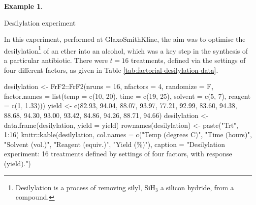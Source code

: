 \documentclass[
]{book}
\newenvironment{Shaded}{\begin{snugshade}}{\end{snugshade}}
\newcommand{\AttributeTok}[1]{\textcolor[rgb]{0.77,0.63,0.00}{#1}}
\newcommand{\DecValTok}[1]{\textcolor[rgb]{0.00,0.00,0.81}{#1}}
\newcommand{\FloatTok}[1]{\textcolor[rgb]{0.00,0.00,0.81}{#1}}
\newcommand{\FunctionTok}[1]{\textcolor[rgb]{0.00,0.00,0.00}{#1}}
\newcommand{\NormalTok}[1]{#1}
\newcommand{\OtherTok}[1]{\textcolor[rgb]{0.56,0.35,0.01}{#1}}
\newcommand{\SpecialCharTok}[1]{\textcolor[rgb]{0.00,0.00,0.00}{#1}}
\newcommand{\StringTok}[1]{\textcolor[rgb]{0.31,0.60,0.02}{#1}}
\theoremstyle{definition}
\theoremstyle{definition}
\newtheorem{example}{Example}[chapter]
\theoremstyle{definition}
\theoremstyle{definition}
\theoremstyle{remark}
\begin{document}
\begin{example}
\protect\hypertarget{exm:factorial-desilylation}{}\label{exm:factorial-desilylation}

Desilylation experiment \citep{Owen2001}

In this experiment, performed at GlaxoSmithKline, the aim was to optimise the desilylation\footnote{Desilylation is a process of removing silyl, SiH\(_3\) a silicon hydride, from a compound.} of an ether into an alcohol, which was a key step in the synthesis of a particular antibiotic. There were \(t=16\) treatments, defined via the settings of four different factors, as given in Table \ref{tab:factorial-desilylation-data}.

\begin{Shaded}
\begin{Highlighting}[]
\NormalTok{desilylation }\OtherTok{\textless{}{-}}\NormalTok{ FrF2}\SpecialCharTok{::}\FunctionTok{FrF2}\NormalTok{(}\AttributeTok{nruns =} \DecValTok{16}\NormalTok{, }\AttributeTok{nfactors =} \DecValTok{4}\NormalTok{, }\AttributeTok{randomize =}\NormalTok{ F,}
                           \AttributeTok{factor.names =} \FunctionTok{list}\NormalTok{(}\AttributeTok{temp =} \FunctionTok{c}\NormalTok{(}\DecValTok{10}\NormalTok{, }\DecValTok{20}\NormalTok{), }\AttributeTok{time =} \FunctionTok{c}\NormalTok{(}\DecValTok{19}\NormalTok{, }\DecValTok{25}\NormalTok{),}
                                               \AttributeTok{solvent =} \FunctionTok{c}\NormalTok{(}\DecValTok{5}\NormalTok{, }\DecValTok{7}\NormalTok{), }\AttributeTok{reagent =} \FunctionTok{c}\NormalTok{(}\DecValTok{1}\NormalTok{, }\FloatTok{1.33}\NormalTok{)))}
\NormalTok{yield }\OtherTok{\textless{}{-}} \FunctionTok{c}\NormalTok{(}\FloatTok{82.93}\NormalTok{, }\FloatTok{94.04}\NormalTok{, }\FloatTok{88.07}\NormalTok{, }\FloatTok{93.97}\NormalTok{, }\FloatTok{77.21}\NormalTok{, }\FloatTok{92.99}\NormalTok{, }\FloatTok{83.60}\NormalTok{, }\FloatTok{94.38}\NormalTok{, }
           \FloatTok{88.68}\NormalTok{, }\FloatTok{94.30}\NormalTok{, }\FloatTok{93.00}\NormalTok{, }\FloatTok{93.42}\NormalTok{, }\FloatTok{84.86}\NormalTok{, }\FloatTok{94.26}\NormalTok{, }\FloatTok{88.71}\NormalTok{, }\FloatTok{94.66}\NormalTok{)}
\NormalTok{desilylation }\OtherTok{\textless{}{-}} \FunctionTok{data.frame}\NormalTok{(desilylation, }\AttributeTok{yield =}\NormalTok{ yield)}
\FunctionTok{rownames}\NormalTok{(desilylation) }\OtherTok{\textless{}{-}} \FunctionTok{paste}\NormalTok{(}\StringTok{"Trt"}\NormalTok{, }\DecValTok{1}\SpecialCharTok{:}\DecValTok{16}\NormalTok{)}
\NormalTok{knitr}\SpecialCharTok{::}\FunctionTok{kable}\NormalTok{(desilylation, }
             \AttributeTok{col.names =} \FunctionTok{c}\NormalTok{(}\StringTok{"Temp (degrees C)"}\NormalTok{, }\StringTok{"Time (hours)"}\NormalTok{, }\StringTok{"Solvent (vol.)"}\NormalTok{, }
                           \StringTok{"Reagent (equiv.)"}\NormalTok{, }\StringTok{"Yield (\%)"}\NormalTok{),}
             \AttributeTok{caption =} \StringTok{"Desilylation experiment: 16 treatments defined }
\StringTok{             by settings of four factors, with response (yield)."}\NormalTok{)}
\end{Highlighting}
\end{Shaded}


\end{example}
\end{document}

